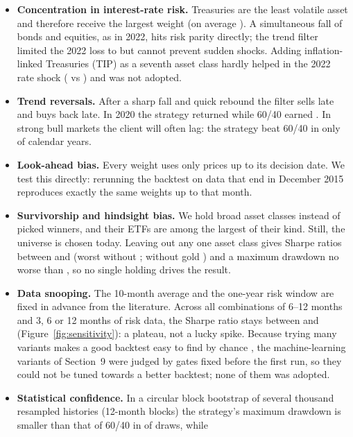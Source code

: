 \begin{itemize}[leftmargin=1em]
\item \textbf{Concentration in interest-rate risk.} Treasuries are the least volatile asset and therefore receive the largest
weight (on average ). A simultaneous fall of bonds and equities, as in 2022, hits risk parity directly; the trend
filter limited the 2022 loss to  but cannot prevent sudden shocks. Adding inflation-linked Treasuries
(TIP) as a seventh asset class hardly helped in the 2022 rate shock ( vs ) and was not adopted.
\item \textbf{Trend reversals.} After a sharp fall and quick rebound the filter sells late and buys back late. In 2020 the
strategy returned  while 60/40 earned . In strong bull markets the client will often
lag: the strategy beat 60/40 in only  of  calendar years.
\item \textbf{Look-ahead bias.} Every weight uses only prices up to its decision date. We test this directly: rerunning the
backtest on data that end in December 2015 reproduces exactly the same weights up to that month.
\item \textbf{Survivorship and hindsight bias.} We hold broad asset classes instead of picked winners, and their ETFs are
among the largest of their kind. Still, the universe is chosen today. Leaving out any one asset class gives Sharpe ratios
between  and  (worst without ; without gold )
and a maximum drawdown no worse than , so no single holding drives the result.
\item \textbf{Data snooping.} The 10-month average and the one-year risk window are fixed in advance from the literature. Across
all  combinations of 6--12 months and 3, 6 or 12 months of risk data, the Sharpe ratio stays between 
and  (Figure~\ref{fig:sensitivity}): a plateau, not a lucky spike. Because trying many variants makes a good backtest easy to find by
chance \citep{bailey2014pbo}, the machine-learning variants of Section~9 were judged by gates fixed before the first run, so
they could not be tuned towards a better backtest; none of them was adopted.
\item \textbf{Statistical confidence.} In a circular block bootstrap \citep{politis1992} of several thousand resampled histories
(12-month blocks) the strategy's maximum drawdown is smaller than that of 60/40 in  of draws, while

\end{itemize}
